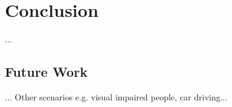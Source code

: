 \chapter{Conclusion}
...

\section{Future Work}
...
Other scenarios e.g. visual impaired people, car driving...